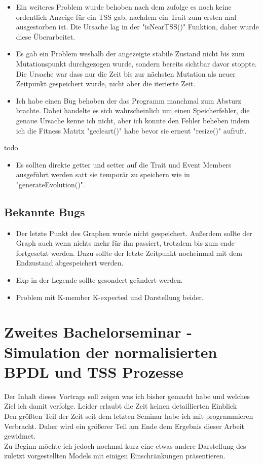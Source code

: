 \documentclass{article}
\begin{document}
\begin{itemize}
	\item Ein weiteres Problem wurde behoben nach dem zufolge es noch keine ordentlich Anzeige für ein TSS gab, nachdem ein Trait zum ersten mal ausgestorben ist. Die Ursache lag in der "{}isNearTSS()"{} Funktion, daher wurde diese Überarbeitet.
	\item Es gab ein Problem weshalb der angezeigte stabile Zustand nicht bis zum Mutationspunkt durchgezogen wurde, sondern bereits sichtbar davor stoppte. Die Ursache war dass nur die Zeit bis zur nächsten Mutation als neuer Zeitpunkt gespeichert wurde, nicht aber die iterierte Zeit.
	\item Ich habe einen Bug behoben der das Programm manchmal zum Absturz brachte. Dabei handelte es sich wahrscheinlich um einen Speicherfehler, die genaue Ursache kenne ich nicht, aber ich konnte den Fehler beheben indem ich die Fitness Matrix "{}gecleart()"{} habe bevor sie erneut "{}resize()"{} aufruft.
\end{itemize}
todo
\begin{itemize}
 \item Es sollten direkte getter und setter auf die Trait und Event Members ausgeführt werden satt sie temporär zu speichern wie in "{}generateEvolution()"{}. 
\end{itemize}
\subsection{Bekannte Bugs}
\begin{itemize}
	 \item Der letzte Punkt des Graphen wurde nicht gespeichert. Außerdem sollte der Graph auch wenn nichts mehr für ihn passiert, trotzdem bis zum ende fortgesetzt werden. Dazu sollte der letzte Zeitpunkt nocheinmal mit dem Endzustand abgespeichert werden. 
	 \item Exp in der Legende sollte gesondert geändert werden.
	 \item Problem mit K-member K-expected und Darstellung beider.
\end{itemize}

\newpage
\section{Zweites Bachelorseminar - Simulation der normalisierten BPDL und TSS Prozesse}
Der Inhalt dieses Vortrags soll zeigen was ich bisher gemacht habe und welches Ziel ich damit verfolge. Leider erlaubt die Zeit keinen detaillierten Einblick\\
Den größten Teil der Zeit seit dem letzten Seminar habe ich mit programmieren Verbracht. Daher wird ein größerer Teil am Ende dem Ergebnis dieser Arbeit gewidmet.\\
Zu Beginn möchte ich jedoch nochmal kurz eine etwas andere Darstellung des zuletzt vorgestellten Models mit einigen Einschränkungen präsentieren.
\end{document}
